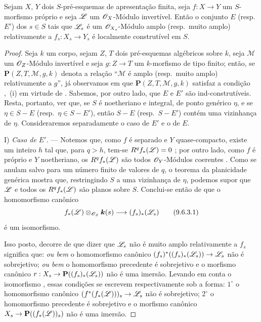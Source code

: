 \begin{proposition}[9.6.3]
\label{IV.9.6.3}
Sejam $X$, $Y$ dois $S$-pré-esquemas de apresentação finita, seja $f:X\to Y$ um $S$-morfismo próprio e seja $\mathscr{L}$ um $\mathscr{O}_X$-Módulo invertível.
Então o conjunto $E$ (resp.\ $E'$) dos $s\in S$ tais que $\mathscr{L}_s$ é um $\mathscr{O}_{X_s}$-Módulo amplo (resp.\ muito amplo) relativamente a $f_s:X_s\to Y_s$ é localmente construtível em $S$.
\end{proposition}

\begin{proof}
Seja $k$ um corpo, sejam $Z$, $T$ dois pré-esquemas algébricos sobre $k$, seja $\mathscr{M}$ um $\mathscr{O}_Z$-Módulo invertível e seja $g:Z\to T$ um $k$-morfismo de tipo finito; então, se $\mathbf{P}(Z,T,\mathscr{M},g,k)$ denota a relação ``$\mathscr{M}$ é amplo (resp.\ muito amplo) relativamente a $g$'', já observamos em  que $\mathbf{P}(Z,T,\mathscr{M},g,k)$ satisfaz a condição ,~(i) em virtude de .
Sabemos, por outro lado, que $E$ e $E'$ são ind-construtíveis.
Resta, portanto, ver que, se $S$ é noetheriano e integral, de ponto genérico $\eta$, e se $\eta\in S-E$ (resp.\ $\eta\in S-E'$), então $S-E$ (resp.\ $S-E'$) contém uma vizinhança de $\eta$.
Consideraremos separadamente o caso de $E'$ e o de $E$.

I) \emph{Caso de $E'$.} --- Notemos que, como $f$ é separado e $Y$ quase-compacto, existe um inteiro $h$ tal que, para $q>h$, tem-se $R^qf_*(\mathscr{L})=0$ ; por outro lado, como $f$ é próprio e $Y$ noetheriano, os $R^qf_*(\mathscr{L})$ são todos $\mathscr{O}_Y$-Módulos coerentes .
Como se anulam salvo para um número finito de valores de $q$, o teorema da planicidade genérica  mostra que, restringindo $S$ a uma vizinhança de $\eta$, podemos supor que $\mathscr{L}$ e todos os $R^qf_*(\mathscr{L})$ são planos sobre $S$.
Conclui-se então de  que o homomorfismo canônico
\begin{equation}
\label{IV.9.6.3.1}
 f_*(\sh{L})\otimes_{\sh{O}_S}\boldsymbol{k}(s)
 \longrightarrow (f_s)_*(\sh{L}_s)
 \tag{9.6.3.1}
\end{equation}
é um isomorfismo.


Isso posto, decorre de  que dizer que $\mathscr{L}_s$ não é muito amplo relativamente a $f_s$ significa que: \emph{ou bem} o homomorfismo canônico $(f_s)^*((f_s)_*(\sh{L}_s))\to\sh{L}_s$ não é sobrejetivo; \emph{ou bem} o homomorfismo precedente é sobrejetivo e o morfismo canônico $r:X_s\to\mathbf{P}((f_s)_*(\sh{L}_s))$ não é uma imersão.
Levando em conta o isomorfismo , essas condições se escrevem respectivamente sob a forma: $1^\circ$ o homomorfismo canônico $(f^*(f_*(\sh{L})))_s\to\sh{L}_s$ não é sobrejetivo; $2^\circ$ o homomorfismo precedente é sobrejetivo e o morfismo canônico $X_s\to\mathbf{P}((f_*(\sh{L}))_s)$ não é uma imersão.


\end{proof}
